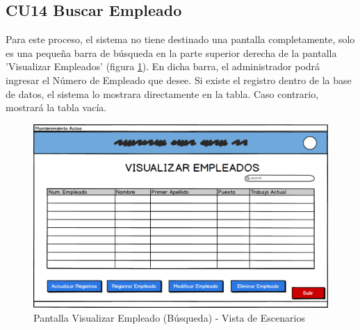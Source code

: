\subsection{CU14 Buscar Empleado}
Para este proceso, el sistema no tiene destinado una pantalla completamente, solo es una pequeña barra de búsqueda en la parte superior derecha de la pantalla 'Visualizar Empleados' (figura \ref{fig:Pantalla Visualizar Empleado (Busqueda) - Vista de Escenarios}). En dicha barra, el administrador podrá ingresar el Número de Empleado que desee. Si existe el registro dentro de la base de datos, el sistema lo mostrara directamente en la tabla. Caso contrario, mostrará la tabla vacía.
\begin{figure}[!h]
	\centering
	\includegraphics[width=1\textwidth]{./diseno/vescenarios/imagenes/visualizarEmpleados}
	\caption{Pantalla Visualizar Empleado (Búsqueda) - Vista de Escenarios}
	\label{fig:Pantalla Visualizar Empleado (Busqueda) - Vista de Escenarios}
\end{figure}
\clearpage